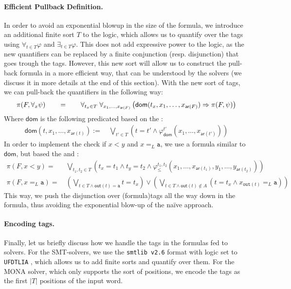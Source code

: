 \paragraph{Efficient Pullback Definition.}
In order to avoid an exponential blowup in the size of the formula, we introduce 
an additional finite sort $T$ to the logic, which allows us to quantify over the tags using $\forall_{t \in T} \varphi$ 
and $\exists_{t \in T} \varphi$. This does not add expressive power to the logic, as the new quantifiers can be replaced by 
a finite conjunction (resp. disjunction) that goes trough the tags. However, this new sort will allow us to construct the pull-back formula
in a more efficient way, that can be understood by the solvers (we discuss it in more details at the end of this section).
With the new sort of tags, we can pull-back the quantifiers in the following way: 
\[ 
\begin{tabular}{ccc}
   $ \pi(F, \forall_{x} \psi)$ & $\quad = \quad$ & $\forall_{t_x \in T} \; \forall_{x_1, \ldots, x_{\mathsf{ar}(F)}} \left( {\mathsf{dom}}(t_x, x_1, \ldots, x_{\mathsf{ar}(F)}) \Rightarrow \pi(F, \psi)\right)$
\end{tabular}
\]
Where $\mathsf{dom}$ is the following predicated based on 
the :
\begin{align*}
    \mathsf{dom}(t, x_1, \ldots, x_{\mathsf{ar}(t)}) :=&~ \bigvee_{t' \in T} \left( t = t' \wedge \varphi_{\mathsf{dom}}^{t'}(x_1, \ldots, x_{\mathsf{ar}(t')}) \right)
\end{align*}
In order to implement the check if $x < y$ and $x =_L \mathtt{a}$, 
we use a formula similar to $\mathsf{dom}$, but based the  and :
\begin{align*}
   \pi(F, x < y)  =&~ \bigvee_{t_1, t_2 \in T} \left( t_x = t_1 \wedge t_y = t_2 \wedge \varphi_{\leq}^{t_1, t_2}(x_1, \ldots, x_{\mathsf{ar}(t_1)}, y_1, \ldots, y_{\mathsf{ar}(t_2)}) \right) \\
   \pi(F, x =_L \mathtt{a}) =&~ \left(\bigvee_{t \in T \wedge \mathsf{out}(t) = \mathtt{a}} t = t_x\right) \vee
\left(\bigvee_{t \in T \wedge \mathsf{out}(t) \not \in A} (t = t_x \wedge x_{\mathtt{out}(t)} =_L \mathtt{a})\right)
\end{align*}
This way, we push the disjunction over \kl(formula){tags} all the way down in the formula,
thus avoiding the exponential blow-up of the naïve approach.

\paragraph{Encoding tags.} Finally, let us briefly discuss how we handle the
tags in the formulas fed to solvers. For the SMT-solvers, we use the
\texttt{smtlib v2.6} format with logic set to \texttt{UFDTLIA}
\cite{BARRETT17}, which allows us to add finite sorts and quantify over them.
For the MONA solver, which only supports the sort of positions, we encode the
tags as the first $|T|$ positions of the input word.


